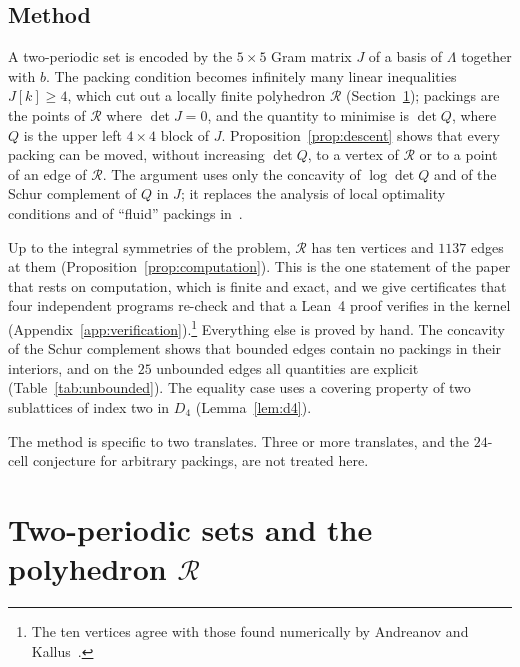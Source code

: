 \documentclass[11pt]{amsart}
\theoremstyle{definition}
\theoremstyle{remark}
\numberwithin{equation}{section}
\numberwithin{table}{section}
\numberwithin{figure}{section}
\newcommand{\Rk}{\mathcal{R}}
\begin{document}
\subsection*{Method}
A two-periodic set is encoded by the $5\times5$ Gram matrix $J$ of a basis of $\Lambda$ together with $b$. The packing condition becomes infinitely many linear inequalities $J[k]\ge4$, which cut out a locally finite polyhedron $\Rk$ (Section~\ref{sec:polyhedron}); packings are the points of $\Rk$ where $\det J=0$, and the quantity to minimise is $\det Q$, where $Q$ is the upper left $4\times4$ block of $J$. Proposition~\ref{prop:descent} shows that every packing can be moved, without increasing $\det Q$, to a vertex of $\Rk$ or to a point of an edge of $\Rk$. The argument uses only the concavity of $\log\det Q$ and of the Schur complement of $Q$ in $J$; it replaces the analysis of local optimality conditions and of ``fluid'' packings in~\cite[Theorem~3]{AK2020}.

Up to the integral symmetries of the problem, $\Rk$ has ten vertices and $1137$ edges at them (Proposition~\ref{prop:computation}). This is the one statement of the paper that rests on computation, which is finite and exact, and we give certificates that four independent programs re-check and that a Lean~4 proof verifies in the kernel (Appendix~\ref{app:verification}).\footnote{The ten vertices agree with those found numerically by Andreanov and Kallus~\cite{AK2020}.} Everything else is proved by hand. The concavity of the Schur complement shows that bounded edges contain no packings in their interiors, and on the $25$ unbounded edges all quantities are explicit (Table~\ref{tab:unbounded}). The equality case uses a covering property of two sublattices of index two in $D_4$ (Lemma~\ref{lem:d4}).

The method is specific to two translates. Three or more translates, and the $24$-cell conjecture for arbitrary packings, are not treated here.

\section{Two-periodic sets and the polyhedron \texorpdfstring{$\Rk$}{R}}\label{sec:polyhedron}
\end{document}
